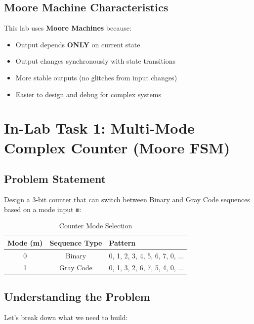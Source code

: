 \documentclass[12pt,a4paper]{article}
\begin{document}
\subsection{Moore Machine Characteristics}

This lab uses \textbf{Moore Machines} because:
\begin{itemize}
    \item Output depends \textbf{ONLY} on current state
    \item Output changes synchronously with state transitions
    \item More stable outputs (no glitches from input changes)
    \item Easier to design and debug for complex systems
\end{itemize}

\newpage
\section{In-Lab Task 1: Multi-Mode Complex Counter (Moore FSM)}

\subsection{Problem Statement}

Design a 3-bit counter that can switch between Binary and Gray Code sequences based on a mode input \texttt{m}:

\begin{table}[H]
    \centering
    \begin{tabular}{|c|c|l|}
        \hline
        \textbf{Mode (m)} & \textbf{Sequence Type} & \textbf{Pattern} \\
        \hline
        0 & Binary & 0, 1, 2, 3, 4, 5, 6, 7, 0, ... \\
        \hline
        1 & Gray Code & 0, 1, 3, 2, 6, 7, 5, 4, 0, ... \\
        \hline
    \end{tabular}
    \caption{Counter Mode Selection}
\end{table}

\subsection{Understanding the Problem}

Let's break down what we need to build:
\end{document}
